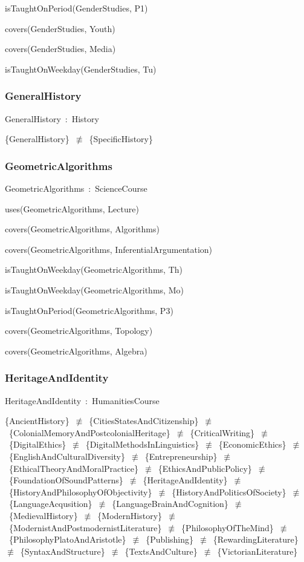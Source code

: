 \documentclass{article}
\begin{document}
isTaughtOnPeriod(GenderStudies, P1)

covers(GenderStudies, Youth)

covers(GenderStudies, Media)

isTaughtOnWeekday(GenderStudies, Tu)

\subsubsection*{GeneralHistory}

GeneralHistory~:~History

\{GeneralHistory\}~\ensuremath{\not\equiv}~\{SpecificHistory\}

\subsubsection*{GeometricAlgorithms}

GeometricAlgorithms~:~ScienceCourse

uses(GeometricAlgorithms, Lecture)

covers(GeometricAlgorithms, Algorithms)

covers(GeometricAlgorithms, InferentialArgumentation)

isTaughtOnWeekday(GeometricAlgorithms, Th)

isTaughtOnWeekday(GeometricAlgorithms, Mo)

isTaughtOnPeriod(GeometricAlgorithms, P3)

covers(GeometricAlgorithms, Topology)

covers(GeometricAlgorithms, Algebra)

\subsubsection*{HeritageAndIdentity}

HeritageAndIdentity~:~HumanitiesCourse

\{AncientHistory\}~\ensuremath{\not\equiv}~\{CitiesStatesAndCitizenship\}~\ensuremath{\not\equiv}~\{ColonialMemoryAndPostcolonialHeritage\}~\ensuremath{\not\equiv}~\{CriticalWriting\}~\ensuremath{\not\equiv}~\{DigitalEthics\}~\ensuremath{\not\equiv}~\{DigitalMethodsInLinguistics\}~\ensuremath{\not\equiv}~\{EconomicEthics\}~\ensuremath{\not\equiv}~\{EnglishAndCulturalDiversity\}~\ensuremath{\not\equiv}~\{Entrepreneurship\}~\ensuremath{\not\equiv}~\{EthicalTheoryAndMoralPractice\}~\ensuremath{\not\equiv}~\{EthicsAndPublicPolicy\}~\ensuremath{\not\equiv}~\{FoundationOfSoundPatterns\}~\ensuremath{\not\equiv}~\{HeritageAndIdentity\}~\ensuremath{\not\equiv}~\{HistoryAndPhilosophyOfObjectivity\}~\ensuremath{\not\equiv}~\{HistoryAndPoliticsOfSociety\}~\ensuremath{\not\equiv}~\{LanguageAcqusition\}~\ensuremath{\not\equiv}~\{LanguageBrainAndCognition\}~\ensuremath{\not\equiv}~\{MedievalHistory\}~\ensuremath{\not\equiv}~\{ModernHistory\}~\ensuremath{\not\equiv}~\{ModernistAndPostmodernistLiterature\}~\ensuremath{\not\equiv}~\{PhilosophyOfTheMind\}~\ensuremath{\not\equiv}~\{PhilosophyPlatoAndAristotle\}~\ensuremath{\not\equiv}~\{Publishing\}~\ensuremath{\not\equiv}~\{RewardingLiterature\}~\ensuremath{\not\equiv}~\{SyntaxAndStructure\}~\ensuremath{\not\equiv}~\{TextsAndCulture\}~\ensuremath{\not\equiv}~\{VictorianLiterature\}
\end{document}
